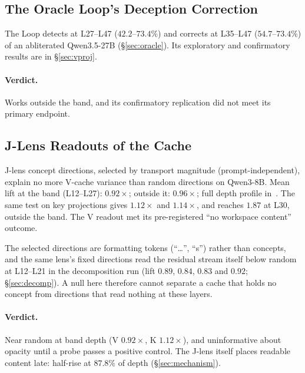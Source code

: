 \documentclass[11pt,a4paper]{article}
\begin{document}


\subsection{The Oracle Loop's Deception Correction}
\label{sec:oracle-depth}

The Loop detects at L27--L47 ($42.2$--$73.4\%$) and corrects at L35--L47
($54.7$--$73.4\%$) of an abliterated Qwen3.5-27B (\S\ref{sec:oracle}).
Its exploratory and confirmatory results are in \S\ref{sec:vproj}.

\paragraph{Verdict.} Works outside the band, and its confirmatory
replication did not meet its primary endpoint.

\subsection{J-Lens Readouts of the Cache}
\label{sec:jlens-readout}
\label{sec:opacity}

J-lens concept directions, selected by transport magnitude
(prompt-independent), explain no more V-cache variance than random
directions on Qwen3-8B. Mean lift at the band (L12--L27): $0.92\times$;
outside it: $0.96\times$; full depth profile
in~\citep{lyra2026cache_tracing}. The same test on key projections gives
$1.12\times$ and $1.14\times$, and reaches $1.87$ at L30, outside the
band. The V readout met its pre-registered ``no workspace content''
outcome.

The selected directions are formatting tokens (``\ldots'', ``s'') rather
than concepts, and the same lens's fixed directions read the residual
stream itself below random at L12--L21 in the decomposition run (lift
$0.89$, $0.84$, $0.83$ and $0.92$; \S\ref{sec:decomp}). A null here
therefore cannot separate a cache that holds no concept from directions
that read nothing at these layers.

\paragraph{Verdict.} Near random at band depth (V $0.92\times$, K
$1.12\times$), and uninformative about opacity until a probe passes a
positive control. The J-lens itself places readable content late:
half-rise at $87.8\%$ of depth (\S\ref{sec:mechanism}).
\end{document}
